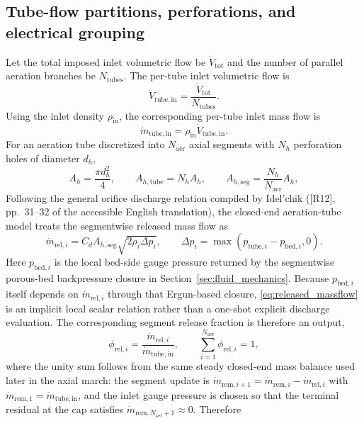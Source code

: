 \documentclass[11pt]{article}
\begin{document}
\subsection{Tube-flow partitions, perforations, and electrical grouping}
Let the total imposed inlet volumetric flow be \(\dot V_{\mathrm{tot}}\) and the number of parallel aeration branches be \(N_{\mathrm{tubes}}\). The per-tube inlet volumetric flow is
\begin{equation}
\label{eq:volflow_per_tube}
\dot V_{\mathrm{tube,in}}=\frac{\dot V_{\mathrm{tot}}}{N_{\mathrm{tubes}}}.
\end{equation}
Using the inlet density \(\rho_{\mathrm{in}}\), the corresponding per-tube inlet mass flow is
\begin{equation}
\label{eq:massflow_per_tube}
\dot m_{\mathrm{tube,in}}=\rho_{\mathrm{in}}\dot V_{\mathrm{tube,in}}.
\end{equation}
For an aeration tube discretized into \(N_{\mathrm{aer}}\) axial segments with \(N_h\) perforation holes of diameter \(d_h\),
\begin{equation}
\label{eq:hole_area}
A_h=\frac{\pi d_h^2}{4},
\qquad
A_{h,\mathrm{tube}}=N_h A_h,
\qquad
A_{h,\mathrm{seg}}=\frac{N_h}{N_{\mathrm{aer}}}A_h,
\end{equation}
Following the general orifice discharge relation compiled by Idel'chik ([R12], pp.~31--32 of the accessible English translation), the closed-end aeration-tube model treats the segmentwise released mass flow as
\begin{equation}
\label{eq:released_massflow}
\dot m_{\mathrm{rel},i}=C_d A_{h,\mathrm{seg}}\sqrt{2\rho_i\Delta p_i},
\qquad
\Delta p_i=\max\!\left(p_{\mathrm{tube},i}-p_{\mathrm{bed},i},0\right).
\end{equation}
Here \(p_{\mathrm{bed},i}\) is the local bed-side gauge pressure returned by the segmentwise porous-bed backpressure closure in Section~\ref{sec:fluid_mechanics}. Because \(p_{\mathrm{bed},i}\) itself depends on \(\dot m_{\mathrm{rel},i}\) through that Ergun-based closure, \eqref{eq:released_massflow} is an implicit local scalar relation rather than a one-shot explicit discharge evaluation.
The corresponding segment release fraction is therefore an output,
\begin{equation}
\label{eq:segment_release_fraction}
\phi_{\mathrm{rel},i}=\frac{\dot m_{\mathrm{rel},i}}{\dot m_{\mathrm{tube,in}}},
\qquad
\sum_{i=1}^{N_{\mathrm{aer}}}\phi_{\mathrm{rel},i}=1,
\end{equation}
where the unity sum follows from the same steady closed-end mass balance used later in the axial march: the segment update is \(\dot m_{\mathrm{rem},i+1}=\dot m_{\mathrm{rem},i}-\dot m_{\mathrm{rel},i}\) with \(\dot m_{\mathrm{rem},1}=\dot m_{\mathrm{tube,in}}\), and the inlet gauge pressure is chosen so that the terminal residual at the cap satisfies \(\dot m_{\mathrm{rem},N_{\mathrm{aer}}+1}\approx 0\). Therefore
\end{document}
